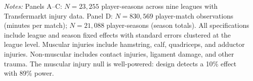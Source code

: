 \begin{table}[t]
\begin{threeparttable}
\begin{tablenotes}[flushleft]\footnotesize
\item \textit{Notes:} Panels A--C: $N = 23{,}255$ player-seasons
across nine leagues with Transfermarkt injury data. Panel D:
$N = 830{,}569$ player-match observations (minutes per match);
$N = 21{,}088$ player-seasons (season totals). All specifications
include league and season fixed effects with standard errors
clustered at the league level. Muscular injuries include hamstring,
calf, quadriceps, and adductor injuries. Non-muscular includes
contact injuries, ligament damage, and other trauma. The muscular
injury null is well-powered: design detects a 10\% effect with
89\% power.
\end{tablenotes}
\end{threeparttable}
\end{table}
